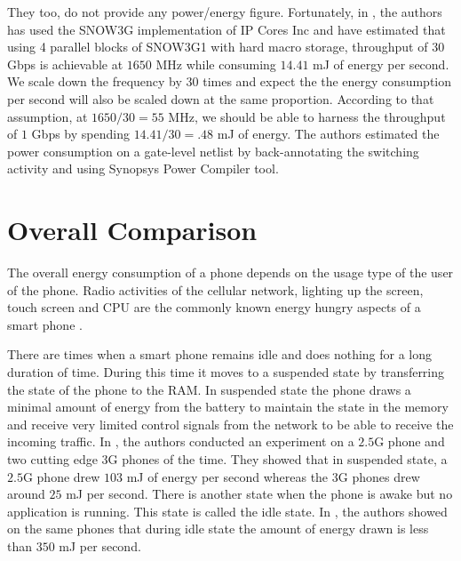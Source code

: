 \documentclass[lnicst,sechang,a4paper]{svmultln}
\begin{document}
They too, do not provide any power/energy figure. Fortunately, in \cite{kolkata}, the authors has used the SNOW3G implementation of IP Cores Inc and have estimated that using 4 parallel blocks of SNOW3G1 with hard macro storage, throughput of 30 Gbps is achievable at $1650$ MHz while consuming $14.41$ mJ of energy per second. We scale down the frequency by $30$ times and expect the the energy consumption per second will also be scaled down at the same proportion. According to that assumption, at $1650/30=55$ MHz, we should be able to harness the throughput of $1$ Gbps by spending $14.41/30 = .48$ mJ of energy. The authors estimated the power consumption on a gate-level netlist by back-annotating the switching activity and using Synopsys Power Compiler tool.

\section{Overall Comparison}
\label{sec:overall_comparison}
The overall energy consumption of a phone depends on the usage type of the user of the phone. Radio activities of the cellular network, lighting up the screen, touch screen and CPU are the commonly known energy hungry aspects of a smart phone \cite{Usenix_2010}. 

There are times when a smart phone remains idle and does nothing for a long duration of time. During this time it moves to a suspended state by transferring the state of the phone to the RAM. In suspended state the phone draws a minimal amount of energy from the battery to maintain the state in the memory and receive very limited control signals from the network to be able to receive the incoming traffic. In \cite{Usenix_2010}, the authors conducted an experiment on a $2.5$G phone and two cutting edge $3$G phones of the time. They showed that in suspended state, a $2.5$G phone drew $103$ mJ of energy per second whereas the 3G phones drew around $25$ mJ per second. There is another state when the phone is awake but no application is running. This state is called the idle state. In \cite{Usenix_2010}, the authors showed on the same phones that during idle state the amount of energy drawn is less than $350$ mJ per second. 
\end{document}
